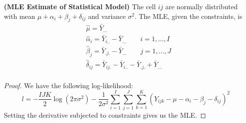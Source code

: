\begin{proposition}{\textbf{(MLE Estimate of Statistical Model)}}
    The cell $ij$ are normally distributed with mean $\mu + \alpha_i + \beta_j + \delta_{ij}$ and variance $\sigma^2$. The MLE, given the constraints, is 
    \begin{equation*}
    \begin{aligned}
        &\hat{\mu} = \bar{Y}_{...} \\
        &\hat{\alpha}_i = \bar{Y}_{i..} - \bar{Y}_{...} \qquad i = 1,\dots,I \\
        &\hat{\beta}_j = \bar{Y}_{.j.} - \bar{Y}_{...} \qquad j = 1,\dots,J \\
        &\hat{\delta}_{ij} = \bar{Y}_{ij.} - \bar{Y}_{i..} - \bar{Y}_{.j.} + \bar{Y}_{...} \\
    \end{aligned}
    \end{equation*}
\end{proposition}
\begin{proof}
    We have the following log-likelihood:
    \begin{equation*}
        l = -\frac{IJK}{2}\log(2\pi\sigma^2) - \frac{1}{2\sigma^2}\sum^I_{i=1}\sum^J_{j=1}\sum^K_{k=1}(Y_{ijk} - \mu - \alpha_i - \beta_j - \delta_{ij})^2
    \end{equation*}
    Setting the derivative subjected to constraints gives us the MLE.
\end{proof}

